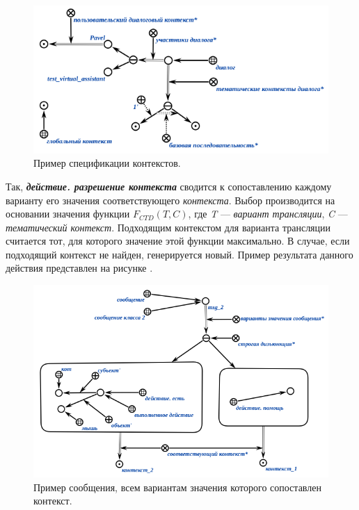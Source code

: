 \begin{figure}[h]
    \centering
    \includegraphics[scale=0.8]{images/part4/chapter_nl_interfaces/user_context}
    \caption{Пример спецификации контекстов.}
    \label{fig:user_context}
\end{figure}

Так, \textit{\textbf{действие. разрешение контекста}} сводится к сопоставлению каждому варианту его значения соответствующего \textit{контекста}.
Выбор производится на основании значения функции \textit{$F_{CTD}(T, C)$}, где \textit{T} --- \textit{вариант трансляции}, \textit{C} --- \textit{тематический контекст}.
Подходящим контекстом для варианта трансляции считается тот, для которого значение этой функции максимально.
В случае, если подходящий контекст не найден, генерируется новый.
Пример результата данного действия представлен на рисунке \textit{}.

\begin{figure}[h]
    \centering
    \includegraphics[scale=0.8]{images/part4/chapter_nl_interfaces/relevant_contexts}
    \caption{Пример сообщения, всем вариантам значения которого сопоставлен контекст.}
    \label{fig:relevant_contexts}
\end{figure}

